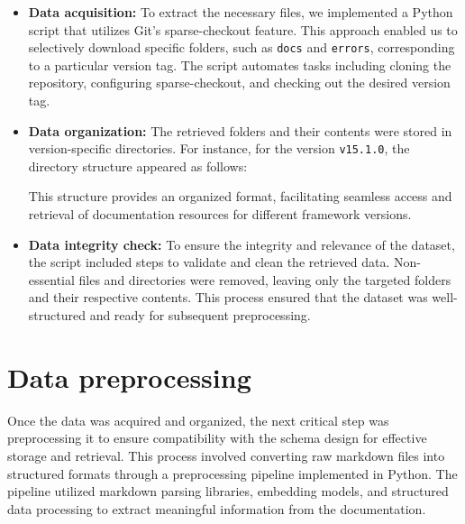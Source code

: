 \begin{itemize}
	\item \textbf{Data acquisition:} 
	To extract the necessary files, we implemented a Python script that utilizes Git's sparse-checkout feature. This approach enabled us to selectively download specific folders, such as \texttt{docs} and \texttt{errors}, corresponding to a particular version tag. The script automates tasks including cloning the repository, configuring sparse-checkout, and checking out the desired version tag.
	
	\item \textbf{Data organization:} 
	The retrieved folders and their contents were stored in version-specific directories. For instance, for the version \texttt{v15.1.0}, the directory structure appeared as follows:
	
	
	This structure provides an organized format, facilitating seamless access and retrieval of documentation resources for different framework versions.
	
	\item \textbf{Data integrity check:} 
	To ensure the integrity and relevance of the dataset, the script included steps to validate and clean the retrieved data. Non-essential files and directories were removed, leaving only the targeted folders and their respective contents. This process ensured that the dataset was well-structured and ready for subsequent preprocessing.
\end{itemize}

\section{Data preprocessing}

Once the data was acquired and organized, the next critical step was preprocessing it to ensure compatibility with the schema design for effective storage and retrieval. This process involved converting raw markdown files into structured formats through a preprocessing pipeline implemented in Python. The pipeline utilized markdown parsing libraries, embedding models, and structured data processing to extract meaningful information from the documentation.

